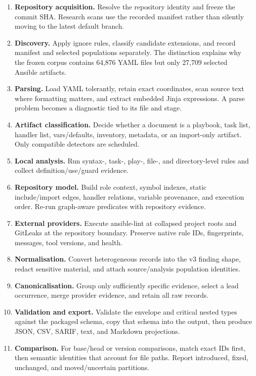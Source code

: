 \begin{enumerate}
  \item \textbf{Repository acquisition.} Resolve the repository identity and
  freeze the commit SHA. Research scans use the recorded manifest rather than
  silently moving to the latest default branch.
  \item \textbf{Discovery.} Apply ignore rules, classify candidate extensions,
  and record manifest and selected populations separately. The distinction
  explains why the frozen corpus contains 64,876 YAML files but only 27,709
  selected Ansible artifacts.
  \item \textbf{Parsing.} Load YAML tolerantly, retain exact coordinates, scan
  source text where formatting matters, and extract embedded Jinja expressions.
  A parse problem becomes a diagnostic tied to its file and stage.
  \item \textbf{Artifact classification.} Decide whether a document is a
  playbook, task list, handler list, vars/defaults, inventory, metadata, or an
  import-only artifact. Only compatible detectors are scheduled.
  \item \textbf{Local analysis.} Run syntax-, task-, play-, file-, and
  directory-level rules and collect definition/use/guard evidence.
  \item \textbf{Repository model.} Build role context, symbol indexes, static
  include/import edges, handler relations, variable provenance, and execution
  order. Re-run graph-aware predicates with repository evidence.
  \item \textbf{External providers.} Execute ansible-lint at collapsed project
  roots and GitLeaks at the repository boundary. Preserve native rule IDs,
  fingerprints, messages, tool versions, and health.
  \item \textbf{Normalisation.} Convert heterogeneous records into the v3
  finding shape, redact sensitive material, and attach source/analysis
  population identities.
  \item \textbf{Canonicalisation.} Group only sufficiently specific evidence,
  select a lead occurrence, merge provider evidence, and retain all raw records.
  \item \textbf{Validation and export.} Validate the envelope and critical
  nested types against the packaged schema, copy that schema into the output,
  then produce JSON, CSV, SARIF, text, and Markdown projections.
  \item \textbf{Comparison.} For base/head or version comparisons, match exact
  IDs first, then semantic identities that account for file paths. Report introduced,
  fixed, unchanged, and moved/uncertain partitions.
\end{enumerate}

